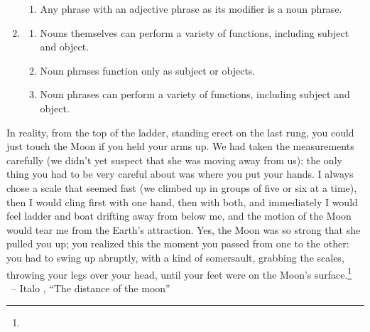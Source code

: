 \begin{tcolorbox}[title=Questions, colback=white]
\begin{enumerate}[noitemsep]
\begin{enumerate}[noitemsep]
            \item Any phrase with an adjective phrase as its modifier is a noun phrase.
        \end{enumerate}
        \item\begin{enumerate}[noitemsep]
            \item Nouns themselves can perform a variety of functions, including subject and object.
            \item Noun phrases function only as subject or objects.
            \item Noun phrases can perform a variety of functions, including subject and object.
        \end{enumerate}
    \end{enumerate}
\end{tcolorbox}



\begin{tcolorbox}[title=Find the nouns, colback=white]
    In reality, from the top of the ladder, standing erect on the last rung, you could just touch the Moon if you held your arms up. We had taken the measurements carefully (we didn't yet suspect that she was moving away from us); the only thing you had to be very careful about was where you put your hands. I always chose a scale that seemed fast (we climbed up in groups of five or six at a time), then I would cling first with one hand, then with both, and immediately I would feel ladder and boat drifting away from below me, and the motion of the Moon would tear me from the Earth's attraction. Yes, the Moon was so strong that she pulled you up; you realized this the moment you passed from one to the other: you had to swing up abruptly, with a kind of somersault, grabbing the scales, throwing your legs over your head, until your feet were on the Moon's surface.\footnote{
}\\\phantom{~}\hfill~-- Italo \citeauthor{calvino2018}, ``The distance of the moon''

\end{tcolorbox}

